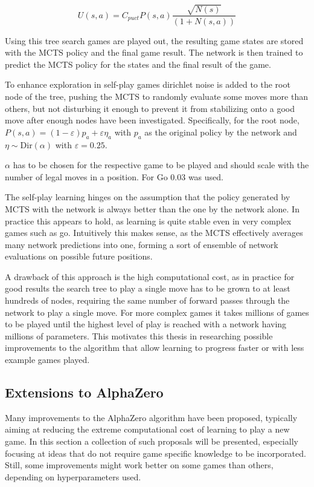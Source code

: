 \documentclass[12pt,onecolumn,oneside,titlepage]{article}
\begin{document}
\begin{equation}
 U(s,a) = C_{puct} P(s,a) \frac{\sqrt{N(s)}}{(1+N(s,a))}\label{eq:alpha_zero_u}
\end{equation}

Using this tree search games are played out, the resulting game states are stored with the MCTS policy and the final game result. The network is then trained to predict the MCTS policy for the states and the final result of the game.

To enhance exploration in self-play games dirichlet noise is added to the root node of the tree, pushing the MCTS to randomly evaluate some moves more than others, but not disturbing it enough to prevent it from stabilizing onto a good move after enough nodes have been investigated.
Specifically, for the root node, $P(s, a) = (1 - \varepsilon)p_a+ \varepsilon \eta_a$ with $p_a$ as the original policy by the network and $\eta \sim \text{Dir}(\alpha)$ with $\varepsilon = 0.25$.

$\alpha$ has to be chosen for the respective game to be played
and should scale with the number of legal moves in a position. For Go $0.03$ was used.

The self-play learning hinges on the assumption that the policy generated by MCTS with the network is always better than the one by the network alone. In practice this appears to hold, as learning is quite stable even in very complex games such as go. Intuitively this makes sense,
as the MCTS effectively averages many network predictions into one, forming a sort of ensemble of network evaluations on possible future positions.

A drawback of this approach is the high computational cost, as in practice for good results the search tree to play a single move has to be grown to at least hundreds of nodes, requiring the same number of forward passes through the network to play a single move.
For more complex games it takes millions of games to be played until the highest level of play is reached with a network having millions of parameters. This motivates this thesis in researching possible improvements to the algorithm that allow learning to progress
faster or with less example games played.

\subsection{Extensions to AlphaZero} \label{s:prev_extensions}

Many improvements to the AlphaZero algorithm have been proposed, typically aiming at reducing the extreme computational cost of learning to play a new game.
In this section a collection of such proposals will be presented, especially focusing at ideas that do not require game specific knowledge to be incorporated. Still, some improvements might work better on some games than others,
depending on hyperparameters used. 
\end{document}
